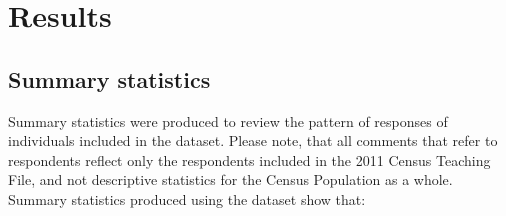 \documentclass[]{book}
\begin{document}
\chapter{Results}\label{results}

\section{Summary statistics}\label{summary-statistics}

Summary statistics were produced to review the pattern of responses of
individuals included in the dataset. Please note, that all comments that
refer to respondents reflect only the respondents included in the 2011
Census Teaching File, and not descriptive statistics for the Census
Population as a whole. Summary statistics produced using the dataset
show that:
\end{document}

